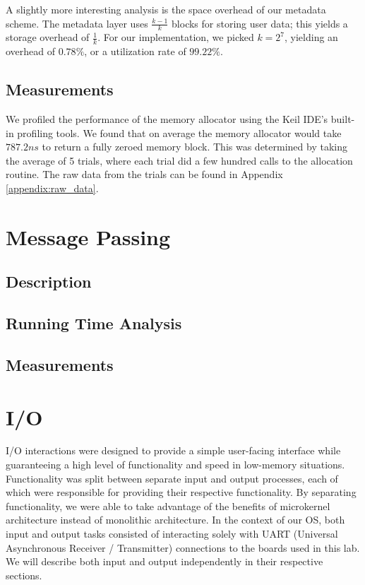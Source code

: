 \documentclass[12pt]{report}
\begin{document}
    A slightly more interesting analysis is the space overhead of our metadata
    scheme. The metadata layer uses $\frac{k-1}{k}$ blocks for storing user
    data; this yields a storage overhead of $\frac{1}{k}$. For our
    implementation, we picked $k=2^7$, yielding an overhead of $0.78\%$, or a
    utilization rate of $99.22\%$.

\section{Measurements}
    We profiled the performance of the memory allocator using the Keil IDE's
    built-in profiling tools. We found that on average the memory allocator
    would take $787.2 ns$ to return a fully zeroed memory block. This was
    determined by taking the average of 5 trials, where each trial did a few
    hundred calls to the allocation routine. The raw data from the trials can
    be found in Appendix \ref{appendix:raw_data}.

\chapter{Message Passing}

\section{Description}

\section{Running Time Analysis}

\section{Measurements}

\chapter{I/O}

    I/O interactions were designed to provide a simple user-facing interface
    while guaranteeing a high level of functionality and speed in low-memory
    situations. Functionality was split between separate input and output
    processes, each of which were responsible for providing their respective
    functionality. By separating functionality, we were able to take advantage
    of the benefits of microkernel architecture instead of monolithic
    architecture.
    In the context of our OS, both input and output tasks consisted of %
    interacting solely with UART (Universal Asynchronous Receiver / Transmitter)
    connections to the boards used in this lab.
    We will describe both input and output independently in their respective
    sections.
\end{document}
